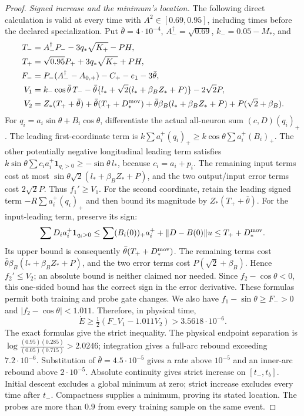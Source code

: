 \documentclass{article} %
\theoremstyle{plain}
\theoremstyle{definition}
\theoremstyle{remark}
\begin{document}
\begin{proof}
\emph{Signed increase and the minimum's location.}
The following direct calculation is valid at every time with
$A^2\in[0.69,0.95]$, including times before the declared specialization.
Put $\bar\theta=4\cdot10^{-4}$, $A_-^\dagger=\sqrt{0.69}$,
$k_-=0.05-M_*$, and
\begin{align*}
 T_-&=A_-^\dagger P_- -3q_*\sqrt{K_+}-PH,\\
 T_+&=\sqrt{0.95}P_++3q_*\sqrt{K_+}+PH,\\
 F_-&=P_-(A_-^\dagger-A_{0,+})-C_+-e_1-3\bar\theta,\\
 V_1&=k_-\cos\bar\theta\,T_-
   -\bar\theta\{l_*+\sqrt2(l_*+\beta_BZ_*+P)\}-2\sqrt2P,\\
 V_2&=Z_*(T_++\bar\theta)+\bar\theta(T_++D_*^{\rm mov})
   +\bar\theta\beta_B(l_*+\beta_BZ_*+P)+P(\sqrt2+\beta_B).
\end{align*}
For $q_i=a_i\sin\theta+B_i\cos\theta$, differentiate the actual
all-neuron sum $(c,D)(q_i)_+$. The leading first-coordinate term is
$k\sum a_i^+(q_i)_+\ge k\cos\theta\sum a_i^+(B_i)_+$.
The other potentially negative longitudinal leading term satisfies
$k\sin\theta\sum c_i a_i^+\mathbf1_{q_i>0}\ge-\sin\theta\,l_*$,
because $c_i=a_i+p_i$. The remaining input terms cost at most
$\sin\theta\sqrt2(l_*+\beta_BZ_*+P)$, and the two output/input error
terms cost $2\sqrt2P$. Thus $f_1'\ge V_1$.
For the second coordinate, retain the leading signed term
$-R\sum a_i^+(q_i)_+$ and then bound its magnitude by
$Z_*(T_++\bar\theta)$. For the input-leading term, preserve its sign:
\[
 \sum D_i a_i^+\mathbf1_{q_i>0}
 \le\sum (B_i(0))_+a_i^++\|D-B(0)\|u
 \le T_++D_*^{\rm mov}.
\]
Its upper bound is consequently $\bar\theta(T_++D_*^{\rm mov})$.
The remaining terms cost
$\bar\theta\beta_B(l_*+\beta_BZ_*+P)$, and the two error terms cost
$P(\sqrt2+\beta_B)$. Hence $f_2'\le V_2$; an absolute bound is neither
claimed nor needed. Since $f_2-\cos\theta<0$, this one-sided bound has
the correct sign in the error derivative.
These formulas permit both training and probe gate changes.
We also have $f_1-\sin\theta\ge F_->0$ and
$|f_2-\cos\theta|<1.011$. Therefore, in physical time,
\[
 \dot E\ge\tfrac12(F_-V_1-1.011V_2)>3.5618\cdot10^{-6}.
\]
The exact formulas give the strict inequality. The physical endpoint
separation is
$\log\frac{(0.95)(0.285)}{(0.05)(0.715)}>2.0246$; integration gives a
full-arc rebound exceeding $7.2\cdot10^{-6}$. Substitution of
$\bar\theta=4.5\cdot10^{-5}$ gives a rate above $10^{-5}$ and an
inner-arc rebound above $2\cdot10^{-5}$. Absolute continuity gives strict increase on $[t_-,t_b]$.
Initial descent excludes a global minimum at zero; strict increase
excludes every time after $t_-$. Compactness supplies a minimum, proving
its stated location. The probes are more than $0.9$ from every training
sample on the same event.
\end{proof}
\end{document}
